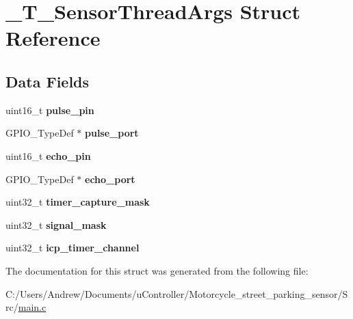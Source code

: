 \hypertarget{struct___t___sensor_thread_args}{}\section{\+\_\+\+T\+\_\+\+Sensor\+Thread\+Args Struct Reference}
\label{struct___t___sensor_thread_args}
\subsection*{Data Fields}
\begin{DoxyCompactItemize}
\item 
\mbox{\label{struct___t___sensor_thread_args_a01a8106ceba923de48b55de66afb014d}} 
uint16\+\_\+t {\bfseries pulse\+\_\+pin}
\item 
\mbox{\label{struct___t___sensor_thread_args_aca0ef7ae4524412537e5a31a1de2e27f}} 
G\+P\+I\+O\+\_\+\+Type\+Def $\ast$ {\bfseries pulse\+\_\+port}
\item 
\mbox{\label{struct___t___sensor_thread_args_a38b1d45547c02cb51b58715aabe1d0c7}} 
uint16\+\_\+t {\bfseries echo\+\_\+pin}
\item 
\mbox{\label{struct___t___sensor_thread_args_a1225f9de823165244e3e2fe19127ad50}} 
G\+P\+I\+O\+\_\+\+Type\+Def $\ast$ {\bfseries echo\+\_\+port}
\item 
\mbox{\label{struct___t___sensor_thread_args_a6353ecd4cee3d50b2f69fd7b390cc388}} 
uint32\+\_\+t {\bfseries timer\+\_\+capture\+\_\+mask}
\item 
\mbox{\label{struct___t___sensor_thread_args_a9647eeb86058ea51bdfe5c1fe6ad1cdf}} 
uint32\+\_\+t {\bfseries signal\+\_\+mask}
\item 
\mbox{\label{struct___t___sensor_thread_args_a4576e8cae7f7ea1e45066fc8ff05f5f5}} 
uint32\+\_\+t {\bfseries icp\+\_\+timer\+\_\+channel}
\end{DoxyCompactItemize}


The documentation for this struct was generated from the following file\+:\begin{DoxyCompactItemize}
\item 
C\+:/\+Users/\+Andrew/\+Documents/u\+Controller/\+Motorcycle\+\_\+street\+\_\+parking\+\_\+sensor/\+Src/\mbox{\hyperlink{main_8c}{main.\+c}}\end{DoxyCompactItemize}
